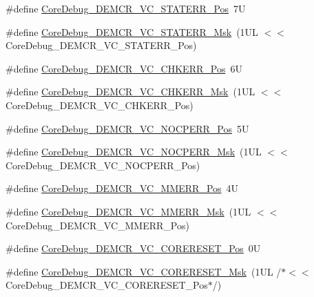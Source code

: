 \begin{DoxyCompactItemize}
\item 
\#define \hyperlink{group___c_m_s_i_s___core_debug_ga16f0d3d2ce1e1e8cd762d938ac56c4ac}{Core\+Debug\+\_\+\+D\+E\+M\+C\+R\+\_\+\+V\+C\+\_\+\+S\+T\+A\+T\+E\+R\+R\+\_\+\+Pos}~7U
\item 
\#define \hyperlink{group___c_m_s_i_s___core_debug_gaa38b947d77672c48bba1280c0a642e19}{Core\+Debug\+\_\+\+D\+E\+M\+C\+R\+\_\+\+V\+C\+\_\+\+S\+T\+A\+T\+E\+R\+R\+\_\+\+Msk}~(1\+U\+L $<$$<$ Core\+Debug\+\_\+\+D\+E\+M\+C\+R\+\_\+\+V\+C\+\_\+\+S\+T\+A\+T\+E\+R\+R\+\_\+\+Pos)
\item 
\#define \hyperlink{group___c_m_s_i_s___core_debug_ga10fc7c53bca904c128bc8e1a03072d50}{Core\+Debug\+\_\+\+D\+E\+M\+C\+R\+\_\+\+V\+C\+\_\+\+C\+H\+K\+E\+R\+R\+\_\+\+Pos}~6U
\item 
\#define \hyperlink{group___c_m_s_i_s___core_debug_ga2f98b461d19746ab2febfddebb73da6f}{Core\+Debug\+\_\+\+D\+E\+M\+C\+R\+\_\+\+V\+C\+\_\+\+C\+H\+K\+E\+R\+R\+\_\+\+Msk}~(1\+U\+L $<$$<$ Core\+Debug\+\_\+\+D\+E\+M\+C\+R\+\_\+\+V\+C\+\_\+\+C\+H\+K\+E\+R\+R\+\_\+\+Pos)
\item 
\#define \hyperlink{group___c_m_s_i_s___core_debug_gac9d13eb2add61f610d5ced1f7ad2adf8}{Core\+Debug\+\_\+\+D\+E\+M\+C\+R\+\_\+\+V\+C\+\_\+\+N\+O\+C\+P\+E\+R\+R\+\_\+\+Pos}~5U
\item 
\#define \hyperlink{group___c_m_s_i_s___core_debug_ga03ee58b1b02fdbf21612809034562f1c}{Core\+Debug\+\_\+\+D\+E\+M\+C\+R\+\_\+\+V\+C\+\_\+\+N\+O\+C\+P\+E\+R\+R\+\_\+\+Msk}~(1\+U\+L $<$$<$ Core\+Debug\+\_\+\+D\+E\+M\+C\+R\+\_\+\+V\+C\+\_\+\+N\+O\+C\+P\+E\+R\+R\+\_\+\+Pos)
\item 
\#define \hyperlink{group___c_m_s_i_s___core_debug_ga444454f7c7748e76cd76c3809c887c41}{Core\+Debug\+\_\+\+D\+E\+M\+C\+R\+\_\+\+V\+C\+\_\+\+M\+M\+E\+R\+R\+\_\+\+Pos}~4U
\item 
\#define \hyperlink{group___c_m_s_i_s___core_debug_gad420a9b60620584faaca6289e83d3a87}{Core\+Debug\+\_\+\+D\+E\+M\+C\+R\+\_\+\+V\+C\+\_\+\+M\+M\+E\+R\+R\+\_\+\+Msk}~(1\+U\+L $<$$<$ Core\+Debug\+\_\+\+D\+E\+M\+C\+R\+\_\+\+V\+C\+\_\+\+M\+M\+E\+R\+R\+\_\+\+Pos)
\item 
\#define \hyperlink{group___c_m_s_i_s___core_debug_ga9fcf09666f7063a7303117aa32a85d5a}{Core\+Debug\+\_\+\+D\+E\+M\+C\+R\+\_\+\+V\+C\+\_\+\+C\+O\+R\+E\+R\+E\+S\+E\+T\+\_\+\+Pos}~0U
\item 
\#define \hyperlink{group___c_m_s_i_s___core_debug_ga906476e53c1e1487c30f3a1181df9e30}{Core\+Debug\+\_\+\+D\+E\+M\+C\+R\+\_\+\+V\+C\+\_\+\+C\+O\+R\+E\+R\+E\+S\+E\+T\+\_\+\+Msk}~(1\+U\+L /$\ast$$<$$<$ Core\+Debug\+\_\+\+D\+E\+M\+C\+R\+\_\+\+V\+C\+\_\+\+C\+O\+R\+E\+R\+E\+S\+E\+T\+\_\+\+Pos$\ast$/)

\end{DoxyCompactItemize}
